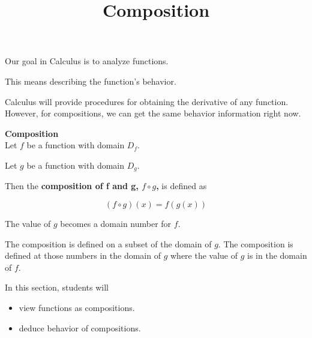 \documentclass{ximera}
\title{Composition}
\begin{document}
\begin{abstract}
%
\end{abstract}
\maketitle





Our goal in Calculus is to analyze functions.


This means describing the function's behavior.

Calculus will provide procedures for obtaining the derivative of any function.  However, for compositions, we can get the same behavior information right now.






\begin{template} \textbf{\textcolor{blue!55!black}{Composition}}  \\


Let $f$ be a function with domain $D_f$.


Let $g$ be a function with domain $D_g$.




Then the \textbf{\textcolor{green!50!black}{composition of f and g, $f \circ g$,}} is defined as

\[
(f \circ g)(x) = f(g(x))
\] 


The value of $g$ becomes a domain number for $f$.


The composition is defined on a subset of the domain of $g$.  The composition is defined at those numbers in the domain of $g$ where the value of $g$ is in the domain of $f$.




\end{template}





\begin{sectionOutcomes}
In this section, students will 

\begin{itemize}
\item view functions as compositions.
\item deduce behavior of compositions.
\end{itemize}
\end{sectionOutcomes}
\end{document}
